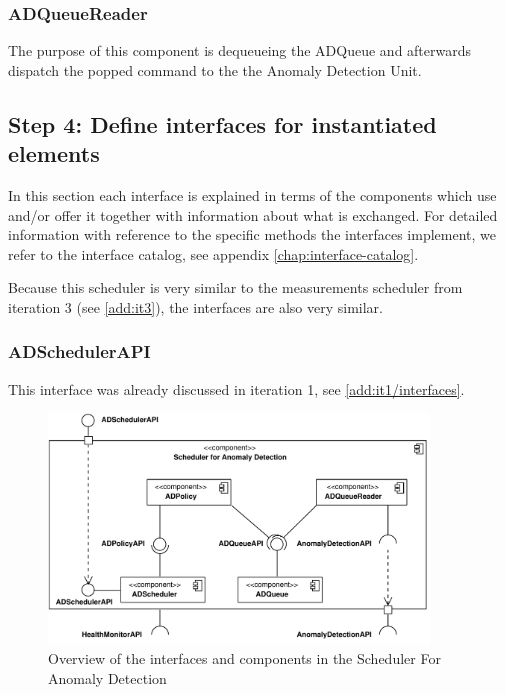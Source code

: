 \subsubsection{ADQueueReader}

\npar The purpose of this component is dequeueing the ADQueue and
afterwards dispatch the popped command to the the Anomaly Detection Unit.

\subsection{Step 4: Define interfaces for instantiated elements}
\label{add:it5/interfaces}

\npar In this section each interface is explained in terms of the components
which use and/or offer it together with information about what is exchanged. For
detailed information with reference to the specific methods the interfaces
implement, we refer to the interface catalog, see appendix
\ref{chap:interface-catalog}.

\npar Because this scheduler is very similar to the measurements scheduler from
iteration 3 (see \ref{add:it3}), the interfaces are also very similar.

\subsubsection{ADSchedulerAPI}

\npar This interface was already discussed in iteration 1, see
\ref{add:it1/interfaces}.

\begin{figure}[H]
	\begin{centering}
		\includegraphics[width=0.9\textwidth]{figs/add-it5-interfaces.pdf}
		\caption{Overview of the interfaces and components in the Scheduler For
		Anomaly Detection}
		\label{fig:it5/interfaces}
	\end{centering}
\end{figure}

